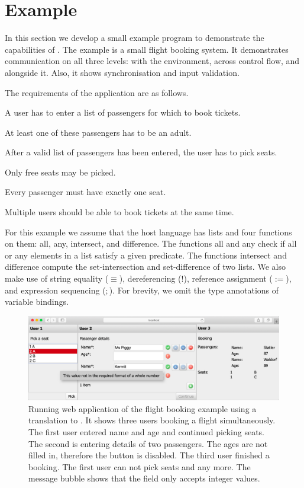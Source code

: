 


\section{Example}
\label{sec:example}

In this section we develop a small example program to demonstrate the capabilities of \TOPHAT.
The example is a small flight booking system.
It demonstrates communication on all three levels: with the environment, across control flow, and alongside it.
Also, it shows synchronisation and input validation.

The requirements of the application are as follows.
\begin{enumerate*}
  \item A user has to enter a list of passengers for which to book tickets.
  \item At least one of these passengers has to be an adult.
  \item After a valid list of passengers has been entered, the user has to pick seats.
  \item Only free seats may be picked.
  \item Every passenger must have exactly one seat.
  \item Multiple users should be able to book tickets at the same time.
\end{enumerate*}
For this example we assume that the host language has lists and four functions on them: all, any, intersect, and difference.
The functions all and any check if all or any elements in a list satisfy a given predicate.
The functions intersect and difference compute the set-intersection and set-difference of two lists.
We also make use of string equality ($\equiv$), dereferencing ($!$), reference assignment ($:=$), and expression sequencing ($;$).
For brevity, we omit the type annotations of variable bindings.


\begin{figure}[b]
  \includegraphics[width=0.8\columnwidth]{figures/flight-booking.png}
  \caption{
    Running web application of the flight booking example using a translation to \ITASKS.
    It shows three users booking a flight simultaneously.
    The first user entered name and age and continued picking seats.
    The second is entering details of two passengers.
    The ages are not filled in, therefore the  button is disabled.
    The third user finished a booking.
    The first user can not pick seats  and  any more.
    The message bubble shows that the  field only accepts integer values.
  }
  \label{fig:flight-booking}
\end{figure}


